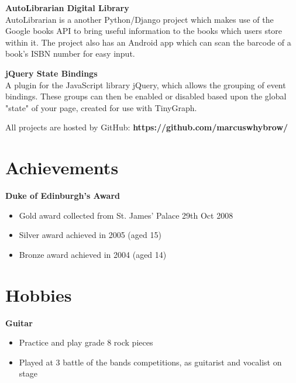 \documentclass[margin,line]{resume}
\begin{document}
\begin{resume}
    \textbf{AutoLibrarian Digital Library}\vspace{1mm}\\%
    AutoLibrarian is a another Python/Django project which makes use of the Google books API to bring useful information to the books which users store within it. The project also has an Android app which can scan the barcode of a book's ISBN number for easy input.
    \vspace{-1.5mm}
    
    \textbf{jQuery State Bindings}\vspace{1mm}\\%
	A plugin for the JavaScript library jQuery, which allows the grouping of event bindings. These groups can then be enabled or disabled based upon the global "state" of your page, created for use with TinyGraph.
    \vspace{-1.5mm}
    
    All projects are hosted by GitHub: {\bf https://github.com/marcuswhybrow/}
    
    \section{\mysidestyle Achievements}

    \textbf{Duke of Edinburgh's Award}\vspace{-4mm}\\%
    \begin{itemize}
		\item Gold award collected from St. James' Palace 29th Oct 2008
		\item Silver award achieved in 2005 (aged 15)
		\item Bronze award achieved in 2004 (aged 14)
    \end{itemize}
    \vspace{-4mm}
    
    \section{\mysidestyle Hobbies}

    \textbf{Guitar}\vspace{-4mm}\\%
    \begin{itemize}
		\item Practice and play grade 8 rock pieces
		\item Played at 3 battle of the bands competitions, as guitarist and vocalist on stage
    \end{itemize}
    \vspace{-2mm}
    

\end{resume}
\end{document}

